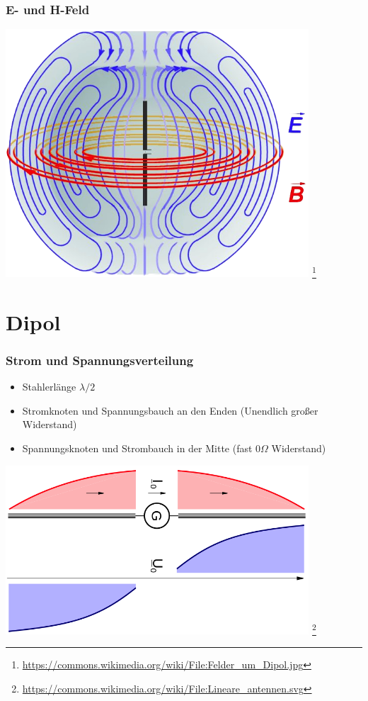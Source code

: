\begin{frame}
    \frametitle{E- und H-Feld}
    \begin{center}
        \includegraphics[width=0.85\textwidth]{e11/Felder_um_Dipol.png}
        \footnote{\tiny \url{https://commons.wikimedia.org/wiki/File:Felder_um_Dipol.jpg}}
	\end{center}
\end{frame}


\section*{Dipol}

\begin{frame}
    \frametitle{Strom und Spannungsverteilung}
	\begin{itemize}
		\item Stahlerlänge $\lambda / 2$
		\item Stromknoten und Spannungsbauch an den Enden (Unendlich großer Widerstand)
        \item Spannungsknoten und Strombauch in der Mitte (fast $0 \Omega$ Widerstand)
    \end{itemize}
    \begin{center}
        \includegraphics[width=0.85\textwidth]{e11/DipolUI.png}
        \footnote{\tiny \url{https://commons.wikimedia.org/wiki/File:Lineare_antennen.svg}}
	\end{center}
\end{frame}


